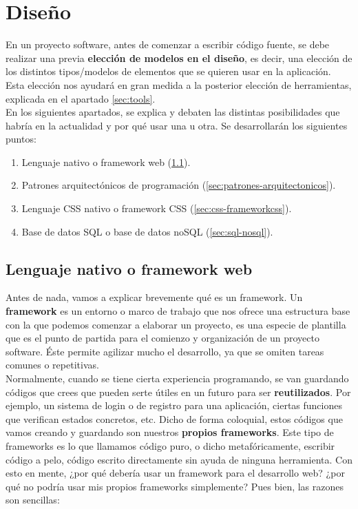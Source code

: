 \chapter{Diseño}
En un proyecto software, antes de comenzar a escribir código fuente, se debe realizar una
previa \textbf{elección de modelos en el diseño}, es decir, una elección de los distintos 
tipos/modelos de elementos que se quieren usar en la aplicación. Esta elección nos ayudará
en gran medida a la posterior elección de herramientas, explicada en el apartado
\ref{sec:tools}.\\

En los siguientes apartados, se explica y debaten las distintas posibilidades que habría en
la actualidad y por qué usar una u otra. Se desarrollarán los siguientes puntos:

    \begin{enumerate}
        \item Lenguaje nativo o framework web (\ref{sec:lenguaje-frameworkweb}).
        \item Patrones arquitectónicos de programación (\ref{sec:patrones-arquitectonicos}).
        \item Lenguaje CSS nativo o framework CSS (\ref{sec:css-frameworkcss}).
        \item Base de datos SQL o base de datos noSQL (\ref{sec:sql-nosql}).
    \end{enumerate}

\section{Lenguaje nativo o framework web} \label{sec:lenguaje-frameworkweb}
Antes de nada, vamos a explicar brevemente qué es un framework. Un \textbf{framework} es
un entorno o marco de trabajo que nos ofrece una estructura base con la que podemos
comenzar a elaborar un proyecto, es una especie de plantilla que es el punto de partida
para el comienzo y organización de un proyecto software. Éste permite agilizar mucho
el desarrollo, ya que se omiten tareas comunes o repetitivas.\\

Normalmente, cuando se tiene cierta experiencia programando, se van guardando códigos que
crees que pueden serte útiles en un futuro para ser \textbf{reutilizados}. Por ejemplo, un
sistema de login o de registro para una aplicación, ciertas funciones que verifican estados
concretos, etc. Dicho de forma coloquial, estos códigos que vamos creando y guardando son
nuestros \textbf{propios frameworks}. Este tipo de frameworks es lo que llamamos código
puro, o dicho metafóricamente, escribir código a pelo, código escrito directamente sin
ayuda de ninguna herramienta. Con esto en mente, ¿por qué debería usar un framework para
el desarrollo web? ¿por qué no podría usar mis propios frameworks simplemente? Pues bien,
las razones son sencillas:

